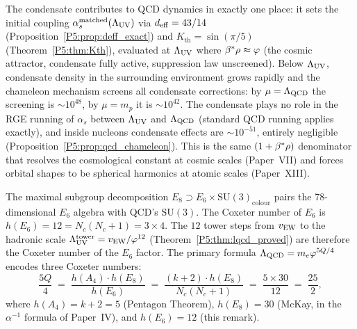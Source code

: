 \begin{remark}
\label{P5:rem:selfconsistency}
The condensate contributes to QCD dynamics in exactly one place: it
sets the initial coupling $\alpha_s^{\mathrm{matched}}(\Lambda_{\mathrm{UV}})$ via
$d_{\mathrm{eff}}=43/14$ (Proposition~\ref{P5:prop:deff_exact}) and $K_{\mathrm{th}}=\sin(\pi/5)$
(Theorem~\ref{P5:thm:Kth}), evaluated at $\Lambda_{\mathrm{UV}}$ where $\beta^{*}\rho\approx\varphi$
(the cosmic attractor, condensate fully active, suppression law
unscreened). Below $\Lambda_{\mathrm{UV}}$, condensate density in the surrounding
environment grows rapidly and the chameleon mechanism screens all
condensate corrections: by $\mu=\Lambda_{\mathrm{QCD}}$ the screening is $\sim10^{48}$,
by $\mu=m_p$ it is $\sim10^{42}$. The condensate plays no role in the
RGE running of $\alpha_s$ between $\Lambda_{\mathrm{UV}}$ and $\Lambda_{\mathrm{QCD}}$ (standard QCD
running applies exactly), and inside nucleons condensate effects are
$\sim10^{-51}$, entirely negligible (Proposition~\ref{P5:prop:qcd_chameleon}).
This is the same $(1+\beta^{*}\rho)$ denominator that resolves the
cosmological constant at cosmic scales (Paper~VII) and forces orbital
shapes to be spherical harmonics at atomic scales (Paper~XIII).
\end{remark}

\begin{remark}
\label{P5:rem:e6_coxeter}
The maximal subgroup decomposition
$E_8\supset E_6\times\mathrm{SU}(3)_{\mathrm{colour}}$ pairs the
78-dimensional $E_6$ algebra with QCD's $\mathrm{SU}(3)$. The Coxeter
number of $E_6$ is $h(E_6)=12=N_c(N_c+1)=3\times4$. The $12$ tower
steps from $v_{\mathrm{EW}}$ to the hadronic scale $\Lambda_{\mathrm{UV}}^{\rm tower}=v_{\mathrm{EW}}/\varphi^{12}$
(Theorem~\ref{P5:thm:lqcd_proved}) are therefore the Coxeter number of
the $E_6$ factor. The primary formula $\Lambda_{\mathrm{QCD}}=m_e\varphi^{5Q/4}$ encodes
three Coxeter numbers:
\begin{equation}
  \frac{5Q}{4}
  \;=\; \frac{h(A_4)\cdot h(E_8)}{h(E_6)}
  \;=\; \frac{(k+2)\cdot h(E_8)}{N_c(N_c+1)}
  \;=\; \frac{5\times30}{12}
  \;=\; \frac{25}{2},
  \label{P5:eq:lqcd_three_coxeters}
\end{equation}
where $h(A_4)=k+2=5$ (Pentagon Theorem), $h(E_8)=30$ (McKay, in the
$\alpha^{-1}$ formula of Paper~IV), and $h(E_6)=12$ (this remark).
\end{remark}

